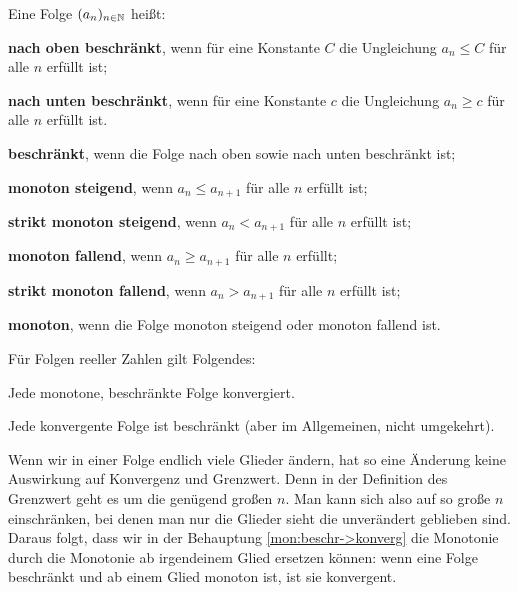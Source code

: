 \begin{defn} Eine Folge $(a_n)_{n \in \mathbb{N}}$ heißt: 
	\begin{enuma}
		\item \textbf{nach oben beschränkt}, wenn für eine Konstante $C$ die Ungleichung $a_n \le C$ für alle $n$ erfüllt ist;
		\item \textbf{nach unten beschränkt}, wenn für eine Konstante $c$ die Ungleichung $a_n \ge c$ für alle $n$ erfüllt ist. 
		\item \textbf{beschränkt}, wenn die Folge nach oben sowie nach unten beschränkt ist; 
		\item \textbf{monoton steigend}, wenn $a_n \le a_{n+1}$ für alle $n$ erfüllt ist;
		\item \textbf{strikt monoton steigend}, wenn $a_n < a_{n+1}$ für alle $n$ erfüllt ist;
		\item \textbf{monoton fallend}, wenn $a_n \ge a_{n+1}$ für alle $n$ erfüllt; 
		\item \textbf{strikt monoton fallend}, wenn $a_n > a_{n+1}$ für alle $n$ erfüllt ist; 
		\item \textbf{monoton}, wenn die Folge monoton steigend oder monoton fallend ist. 
	\end{enuma} 
\end{defn} 

\begin{thm} 
	\label{thm:monot:beschr:folgen} 
	Für Folgen reeller Zahlen gilt Folgendes: 
	\begin{enuma}
		\item \label{mon:beschr->konverg} Jede monotone, beschränkte Folge konvergiert. 
		\item Jede konvergente Folge ist beschränkt (aber im Allgemeinen, nicht umgekehrt). 
	\end{enuma} 
\end{thm} 

\begin{bem}
	Wenn wir in einer Folge endlich viele Glieder ändern, hat so eine Änderung keine Auswirkung auf Konvergenz und Grenzwert. Denn in der Definition des Grenzwert geht es um die genügend großen $n$. Man kann sich also auf so große $n$ einschränken, bei denen man nur die Glieder sieht die unverändert geblieben sind. Daraus folgt, dass wir 
	in der Behauptung \ref{mon:beschr->konverg} die Monotonie durch die Monotonie ab irgendeinem Glied ersetzen können: wenn eine Folge beschränkt und ab einem Glied monoton ist, ist sie konvergent. 
\end{bem} 

